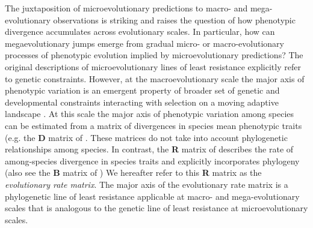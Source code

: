 \documentclass[12pt,letterpaper]{article}
\begin{document}
The juxtaposition of microevolutionary predictions to macro- and mega-evolutionary observations is striking and raises the question of how phenotypic divergence accumulates across evolutionary scales.
In particular, how can megaevolutionary jumps emerge from gradual micro- or macro-evolutionary processes of phenotypic evolution implied by microevolutionary predictions? \cite{hansen2016,jablonski2022evolvability}
The original descriptions of microevolutionary lines of least resistance explicitly refer to genetic constraints.
However, at the macroevolutionary scale the major axis of phenotypic variation is an emergent property of broader set of genetic and developmental constraints interacting with selection on a moving adaptive landscape %
\cite{BurinWhales,jones2004evolution}. %
At this scale the major axis of phenotypic variation among species \cite{marroig2005size, fasanelli2022allometry} can be estimated from a matrix of divergences in species mean phenotypic traits (e.g. the \textbf{D} matrix of \cite{BlowsHiggie2003, mcglothlin2018adaptive}.
These matrices do not take into account phylogenetic relationships among species.
In contrast, the \textbf{R} matrix of \cite{Houle2017} describes the rate of among-species divergence in species traits and explicitly incorporates phylogeny (also see the \textbf{B} matrix of \cite{Machado2020}) %
We hereafter refer to this \textbf{R} matrix as the \textit{evolutionary rate matrix}. %
The major axis of the evolutionary rate matrix is a phylogenetic line of least resistance applicable at macro- and mega-evolutionary scales that is analogous to the genetic line of least resistance at microevolutionary scales. 
\end{document}
